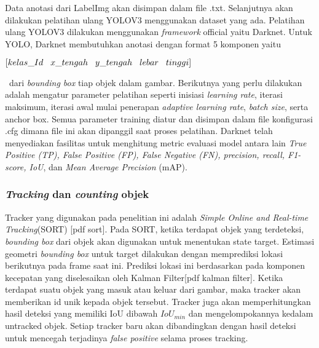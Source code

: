 \documentclass[../thesis.tex]{subfiles}
\begin{document}
Data anotasi dari LabelImg akan disimpan dalam file .txt. Selanjutnya akan dilakukan pelatihan ulang YOLOV3 menggunakan dataset yang ada. Pelatihan ulang YOLOV3 dilakukan menggunakan \textit{framework} official yaitu Darknet. Untuk YOLO, Darknet membutuhkan anotasi dengan format
5 komponen yaitu \\ 
\centerline{$[kelas\_Id \hspace{3mm} x\_tengah \hspace{3mm} y\_tengah \hspace{3mm} lebar \hspace{3mm} tinggi]$}\
dari \textit{bounding box} tiap objek dalam gambar. Berikutnya yang perlu dilakukan adalah mengatur parameter pelatihan seperti inisiasi \textit{learning rate}, iterasi maksimum, iterasi awal mulai penerapan \textit{adaptive learning rate}, \textit{batch size}, serta anchor box. Semua parameter training diatur dan disimpan dalam file konfigurasi .cfg dimana file ini akan 
dipanggil saat proses pelatihan. Darknet telah menyediakan fasilitas untuk menghitung metric evaluasi model antara lain \textit{True Positive (TP), False Positive (FP), False Negative (FN), precision, recall, F1-score, IoU}, dan \textit{Mean Average Precision} (mAP).

\subsubsection{\textit{Tracking} dan \textit{counting} objek}
Tracker yang digunakan pada penelitian ini adalah \textit{Simple Online and Real-time Tracking}(SORT) [pdf sort]. Pada SORT, ketika terdapat objek yang terdeteksi, \textit{bounding box} dari objek akan digunakan untuk menentukan state target. Estimasi geometri \textit{bounding box} untuk target dilakukan dengan memprediksi lokasi berikutnya pada frame saat ini. Prediksi lokasi ini berdasarkan pada komponen kecepatan yang diselesaikan oleh Kalman Filter[pdf kalman filter].
Ketika terdapat suatu objek yang masuk atau keluar dari gambar, maka tracker akan memberikan id unik kepada objek tersebut. Tracker juga akan memperhitungkan hasil deteksi yang memiliki IoU dibawah $IoU_{min}$ dan mengelompokannya kedalam untracked objek. Setiap tracker baru akan dibandingkan dengan hasil deteksi untuk mencegah terjadinya \textit{false positive} selama proses tracking.
\end{document}
